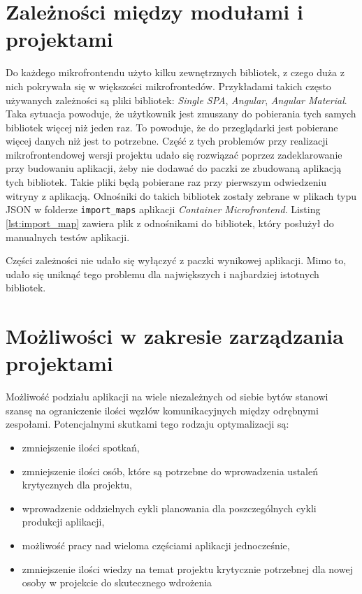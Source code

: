 \documentclass{SGGW-thesis}
\begin{document}
{  \section{Zależności między modułami i projektami}
  Do każdego mikrofrontendu użyto kilku zewnętrznych bibliotek, z czego duża z nich pokrywała się w większości mikrofrontedów. Przykładami takich często używanych zależności są pliki bibliotek: \textit{Single SPA}, \textit{Angular}, \textit{Angular Material}. Taka sytuacja powoduje, że użytkownik jest zmuszany do pobierania tych samych bibliotek więcej niż jeden raz. To powoduje, że do przeglądarki jest pobierane więcej danych niż jest to potrzebne. Część z tych problemów przy realizacji mikrofrontendowej wersji projektu udało się rozwiązać poprzez zadeklarowanie przy budowaniu aplikacji, żeby nie dodawać do paczki ze zbudowaną aplikacją tych bibliotek. Takie pliki będą pobierane raz przy pierwszym odwiedzeniu witryny z aplikacją. Odnośniki do takich bibliotek zostały zebrane w plikach typu JSON w folderze \lstinline{import_maps} aplikacji \textit{Container Microfrontend}. Listing \cref{lst:import_map} zawiera plik z odnośnikami do bibliotek, który posłużył do manualnych testów aplikacji.

  

  Części zależności nie udało się wyłączyć z paczki wynikowej aplikacji. Mimo to, udało się uniknąć tego problemu dla największych i najbardziej istotnych bibliotek.

  \pagebreak

  \section{Możliwości w zakresie zarządzania projektami}
  Możliwość podziału aplikacji na wiele niezależnych od siebie bytów stanowi szansę na ograniczenie ilości węzłów komunikacyjnych między odrębnymi zespołami. Potencjalnymi skutkami tego rodzaju optymalizacji są:

  \begin{itemize}
    \item zmniejszenie ilości spotkań,
    \item zmniejszenie ilości osób, które są potrzebne do wprowadzenia ustaleń krytycznych dla projektu,
    \item wprowadzenie oddzielnych cykli planowania dla poszczególnych cykli produkcji aplikacji,
    \item możliwość pracy nad wieloma częściami aplikacji jednocześnie,
    \item zmniejszenie ilości wiedzy na temat projektu krytycznie potrzebnej dla nowej osoby w projekcie do skutecznego wdrożenia
  \end{itemize}  

}
\end{document}
